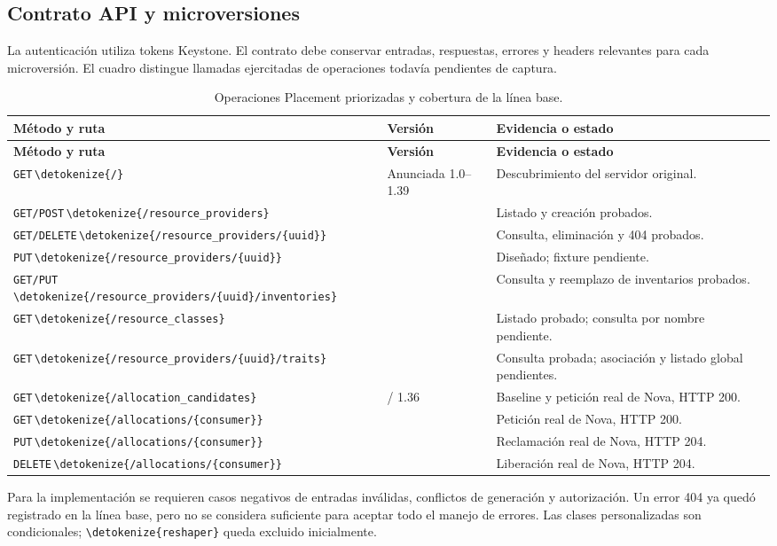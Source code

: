 \documentclass[12pt,a4paper]{article}
\newcommand{\code}[1]{{\small\expandafter\nolinkurl\expandafter{\detokenize{#1}}}}
\newcommand{\reporttable}[4]{\begingroup\small\setlength{\LTpre}{8pt}\setlength{\LTpost}{8pt}\setlength{\tabcolsep}{4pt}\renewcommand{\arraystretch}{1.15}
\begin{longtable}{#2}\caption{#1}\\\toprule #3\\\midrule\endfirsthead
\toprule #3\\\midrule\endhead\bottomrule\endfoot #4\end{longtable}\endgroup}
\begin{document}
\subsection{Contrato API y microversiones}
La autenticación utiliza tokens Keystone. El contrato debe conservar entradas, respuestas, errores y headers relevantes para cada microversión. El cuadro distingue llamadas ejercitadas de operaciones todavía pendientes de captura.
\reporttable{Operaciones Placement priorizadas y cobertura de la línea base.}{>{\raggedright\arraybackslash}p{6.8cm}>{\raggedright\arraybackslash}p{2.2cm}>{\raggedright\arraybackslash}p{6cm}}{\textbf{Método y ruta}&\textbf{Versión}&\textbf{Evidencia o estado}}{
\texttt{\small GET}\,\code{/}&Anunciada 1.0--1.39&Descubrimiento del servidor original.\\*
\texttt{\small GET/POST}\,\code{/resource_providers}&1.0&Listado y creación probados.\\*
\texttt{\small GET/DELETE}\,\code{/resource_providers/{uuid}}&1.0&Consulta, eliminación y 404 probados.\\*
\texttt{\small PUT}\,\code{/resource_providers/{uuid}}&1.0&Diseñado; fixture pendiente.\\*
\texttt{\small GET/PUT}\,\code{/resource_providers/{uuid}/inventories}&1.0&Consulta y reemplazo de inventarios probados.\\*
\texttt{\small GET}\,\code{/resource_classes}&1.2&Listado probado; consulta por nombre pendiente.\\*
\texttt{\small GET}\,\code{/resource_providers/{uuid}/traits}&1.6&Consulta probada; asociación y listado global pendientes.\\*
\texttt{\small GET}\,\code{/allocation_candidates}&1.10 / 1.36&Baseline y petición real de Nova, HTTP 200.\\*
\texttt{\small GET}\,\code{/allocations/{consumer}}&1.28&Petición real de Nova, HTTP 200.\\*
\texttt{\small PUT}\,\code{/allocations/{consumer}}&1.36&Reclamación real de Nova, HTTP 204.\\*
\texttt{\small DELETE}\,\code{/allocations/{consumer}}&1.0&Liberación real de Nova, HTTP 204.\\}
Para la implementación se requieren casos negativos de entradas inválidas, conflictos de generación y autorización. Un error 404 ya quedó registrado en la línea base, pero no se considera suficiente para aceptar todo el manejo de errores. Las clases personalizadas son condicionales; \code{reshaper} queda excluido inicialmente.
\end{document}
